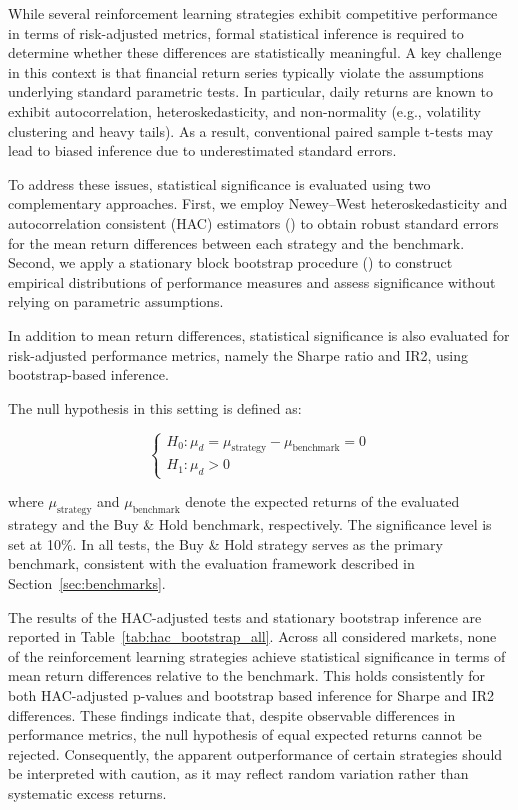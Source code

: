 \documentclass[]{elsarticle}
\begin{document}
While several reinforcement learning strategies exhibit competitive performance in terms of risk-adjusted metrics, formal statistical inference is required to determine whether these differences are statistically meaningful. A key challenge in this context is that financial return series typically violate the assumptions underlying standard parametric tests. In particular, daily returns are known to exhibit autocorrelation, heteroskedasticity, and non-normality (e.g., volatility clustering and heavy tails). As a result, conventional paired sample t-tests may lead to biased inference due to underestimated standard errors.

To address these issues, statistical significance is evaluated using two complementary approaches. First, we employ Newey--West heteroskedasticity and autocorrelation consistent (HAC) estimators (\citet{NEWEY_WEST}) to obtain robust standard errors for the mean return differences between each strategy and the benchmark. Second, we apply a stationary block bootstrap procedure (\citet{POLITIS}) to construct empirical distributions of performance measures and assess significance without relying on parametric assumptions. 

In addition to mean return differences, statistical significance is also evaluated for risk-adjusted performance metrics, namely the Sharpe ratio and IR2, using bootstrap-based inference.

The null hypothesis in this setting is defined as:

\begin{equation}
\begin{cases}
H_0: \mu_{d} = \mu_{\text{strategy}} - \mu_{\text{benchmark}} = 0 \\
H_1: \mu_{d} > 0
\end{cases}
\end{equation}

\noindent where $\mu_{\text{strategy}}$ and $\mu_{\text{benchmark}}$ denote the expected returns of the evaluated strategy and the Buy \& Hold benchmark, respectively. The significance level is set at 10\%. In all tests, the Buy \& Hold strategy serves as the primary benchmark, consistent with the evaluation framework described in Section~\ref{sec:benchmarks}.

The results of the HAC-adjusted tests and stationary bootstrap inference are reported in Table~\ref{tab:hac_bootstrap_all}. Across all considered markets, none of the reinforcement learning strategies achieve statistical significance in terms of mean return differences relative to the benchmark. This holds consistently for both HAC-adjusted p-values and bootstrap based inference for Sharpe and IR2 differences. These findings indicate that, despite observable differences in performance metrics, the null hypothesis of equal expected returns cannot be rejected. Consequently, the apparent outperformance of certain strategies should be interpreted with caution, as it may reflect random variation rather than systematic excess returns.
\end{document}
